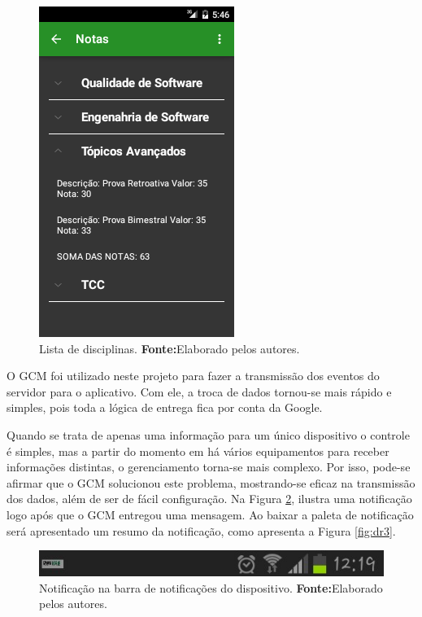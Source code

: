 \begin{figure}[h!]
	\centerline{\includegraphics[scale=0.8]{./imagens/3_discussao_resultados/dr1.png}}
	\caption[Lista de disciplinas]{Lista de disciplinas.
		\textbf{Fonte:}Elaborado pelos autores.}
	\label{fig:dr1}
\end{figure}

	\pagebreak

	\par O GCM foi utilizado neste projeto para fazer a transmissão dos eventos do
servidor para o aplicativo. Com ele, a troca de dados tornou-se mais rápido e
simples, pois toda a lógica de entrega fica por conta da Google.

	\par Quando se trata de apenas uma informação para um único dispositivo o
controle é simples, mas a partir do momento em há vários equipamentos para
receber informações distintas, o gerenciamento torna-se mais complexo. Por
isso, pode-se afirmar que o GCM solucionou este problema, mostrando-se eficaz
na transmissão dos dados, além de ser de fácil configuração. Na Figura
\ref{fig:dr2}, ilustra uma notificação logo após que o GCM entregou uma
mensagem. Ao baixar a paleta de notificação será apresentado um resumo da
notificação, como apresenta a Figura \ref{fig:dr3}.


\begin{figure}[h!]
	\centerline{\includegraphics[scale=0.8]{./imagens/3_discussao_resultados/dr2.png}}
	\caption[Notificação na barra de notificações do dispositivo.]{Notificação na
	barra de notificações do dispositivo.
	\textbf{Fonte:}Elaborado pelos autores.}
	\label{fig:dr2}
\end{figure}


